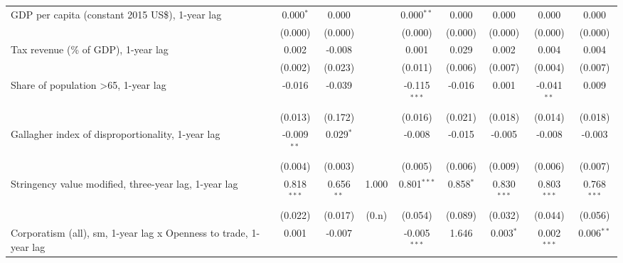 \begin{table}[htbp]
\begin{tabular}{lcccccccc}
      GDP per capita (constant 2015 US\$), 1-year lag                   & 0.000$^{*}$   & 0.000                     &              & 0.000$^{**}$   & 0.000            & 0.000           & 0.000           & 0.000\\   
                                                                        & (0.000)       & (0.000)                   &              & (0.000)        & (0.000)          & (0.000)         & (0.000)         & (0.000)\\   
      Tax revenue (\% of GDP), 1-year lag                               & 0.002         & -0.008                    &              & 0.001          & 0.029            & 0.002           & 0.004           & 0.004\\   
                                                                        & (0.002)       & (0.023)                   &              & (0.011)        & (0.006)          & (0.007)         & (0.004)         & (0.007)\\   
      Share of population >65, 1-year lag                               & -0.016        & -0.039                    &              & -0.115$^{***}$ & -0.016           & 0.001           & -0.041$^{**}$   & 0.009\\   
                                                                        & (0.013)       & (0.172)                   &              & (0.016)        & (0.021)          & (0.018)         & (0.014)         & (0.018)\\   
      Gallagher index of disproportionality, 1-year lag                 & -0.009$^{**}$ & 0.029$^{*}$               &              & -0.008         & -0.015           & -0.005          & -0.008          & -0.003\\   
                                                                        & (0.004)       & (0.003)                   &              & (0.005)        & (0.006)          & (0.009)         & (0.006)         & (0.007)\\   
      Stringency value modified, three-year lag, 1-year lag             & 0.818$^{***}$ & 0.656$^{**}$              & 1.000        & 0.801$^{***}$  & 0.858$^{*}$      & 0.830$^{***}$   & 0.803$^{***}$   & 0.768$^{***}$\\   
                                                                        & (0.022)       & (0.017)                   & (0.n)        & (0.054)        & (0.089)          & (0.032)         & (0.044)         & (0.056)\\   
      Corporatism (all), sm, 1-year lag x Openness to trade, 1-year lag & 0.001         & -0.007                    &              & -0.005$^{***}$ & 1.646            & 0.003$^{*}$     & 0.002$^{***}$   & 0.006$^{**}$\\   

\end{tabular}
\end{table}
